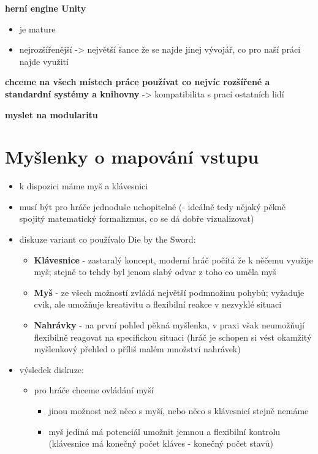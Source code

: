 \textbf{herní engine Unity}
\begin{itemize}
    \item je mature
    \item nejrozšířenější -> největší šance že se najde jinej vývojář, co pro naší práci najde využití
\end{itemize}

\textbf{chceme na všech místech práce používat co nejvíc rozšířené a standardní systémy a knihovny} -> kompatibilita s prací ostatních lidí

\textbf{myslet na modularitu}

\section{Myšlenky o mapování vstupu}
\begin{itemize}
    \item k dispozici máme myš a klávesnici
    \item musí být pro hráče jednoduše uchopitelné (- ideálně tedy nějaký pěkně spojitý matematický formalizmus, co se dá dobře vizualizovat)
    \item diskuze variant co používalo Die by the Sword:
        \begin{itemize}
            \item \textbf{Klávesnice} - zastaralý koncept, moderní hráč počítá že k něčemu využije myš; stejně to tehdy byl jenom slabý odvar z toho co uměla myš
            \item \textbf{Myš} - ze všech možností zvládá největší podmnožinu pohybů; vyžaduje cvik, ale umožňuje kreativitu a flexibilní reakce v nezvyklé situaci
            \item \textbf{Nahrávky} - na první pohled pěkná myšlenka, v praxi však neumožňují flexibilně reagovat na specifickou situaci (hráč je schopen si vést okamžitý myšlenkový přehled o příliš malém množství nahrávek)
        \end{itemize}
    \item výsledek diskuze:
        \begin{itemize}
            \item pro hráče chceme ovládání myší
            \begin{itemize}
                \item jinou možnost než něco s myší, nebo něco s klávesnicí stejně nemáme
                \item myš jediná má potenciál umožnit jemnou a flexibilní kontrolu (klávesnice má konečný počet kláves - konečný počet stavů)

\end{itemize}
\end{itemize}
\end{itemize}
